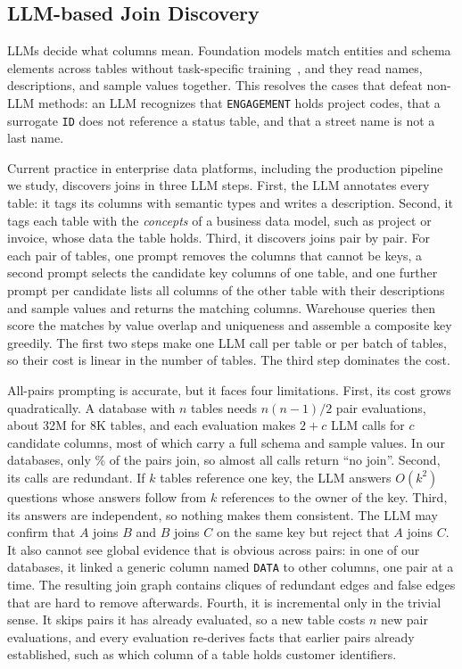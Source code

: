 \subsection{LLM-based Join Discovery}
\label{sec:bg_llm}
LLMs decide what columns mean.
Foundation models match entities and schema elements across tables without task-specific training~\cite{dataWrangleNarayan2022}, and they read names, descriptions, and sample values together.
This resolves the cases that defeat non-LLM methods: an LLM recognizes that \texttt{ENGAGEMENT} holds project codes, that a surrogate \texttt{ID} does not reference a status table, and that a street name is not a last name.

 Current practice in enterprise data platforms, including the production pipeline we study, discovers joins in three LLM steps.
First, the LLM annotates every table: it tags its columns with semantic types and writes a description.
Second, it tags each table with the \emph{concepts} of a business data model, such as project or invoice, whose data the table holds.
Third, it discovers joins pair by pair.
For each pair of tables, one prompt removes the columns that cannot be keys, a second prompt selects the candidate key columns of one table, and one further prompt per candidate lists all columns of the other table with their descriptions and sample values and returns the matching columns.
Warehouse queries then score the matches by value overlap and uniqueness and assemble a composite key greedily.
The first two steps make one LLM call per table or per batch of tables, so their cost is linear in the number of tables.
The third step dominates the cost.

 All-pairs prompting is accurate, but it faces four limitations.
First, its cost grows quadratically.
A database with $n$ tables needs $n(n-1)/2$ pair evaluations, about 32M for 8K tables, and each evaluation makes $2 + c$ LLM calls for $c$ candidate columns, most of which carry a full schema and sample values.
In our databases, only \% of the pairs join, so almost all calls return ``no join''.
Second, its calls are redundant.
If $k$ tables reference one key, the LLM answers $O(k^2)$ questions whose answers follow from $k$ references to the owner of the key.
Third, its answers are independent, so nothing makes them consistent.
The LLM may confirm that $A$ joins $B$ and $B$ joins $C$ on the same key but reject that $A$ joins $C$.
It also cannot see global evidence that is obvious across pairs: in one of our databases, it linked a generic column named \texttt{DATA} to  other columns, one pair at a time.
The resulting join graph contains cliques of redundant edges and false edges that are hard to remove afterwards.
Fourth, it is incremental only in the trivial sense.
It skips pairs it has already evaluated, so a new table costs $n$ new pair evaluations, and every evaluation re-derives facts that earlier pairs already established, such as which column of a table holds customer identifiers.

